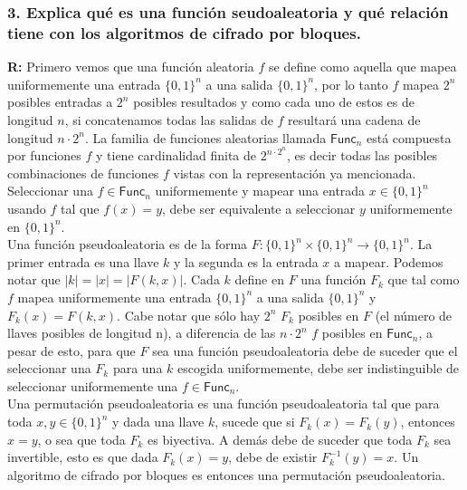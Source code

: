 \documentclass[12pt]{article}
\begin{document}
\subsubsection*{3. Explica qué es una función seudoaleatoria y qué relación tiene con los algoritmos de cifrado por bloques.}

\textbf{R:} Primero vemos que una función aleatoria $f$ se define como aquella que mapea uniformemente una entrada $\{0, 1\}^n$ a una salida $\{0, 1\}^n$, por lo tanto $f$ mapea $2^n$ posibles entradas a $2^n$ posibles resultados y como cada uno de estos es de longitud $n$, si concatenamos todas las salidas de $f$ resultará una cadena de longitud $n \cdot 2^n$. La familia de funciones aleatorias llamada $\textsf{Func}_n$ está compuesta por funciones $f$ y tiene cardinalidad finita de $2^{n\cdot2^n}$, es decir todas las posibles combinaciones de funciones $f$ vistas con la representación ya mencionada. Seleccionar una $f \in \textsf{Func}_n$ uniformemente  y mapear una entrada $x \in \{0, 1\}^n$ usando $f$ tal que $f(x) = y$, debe ser equivalente a seleccionar $y$ uniformemente en $\{0, 1\}^n$. \\

Una función pseudoaleatoria es de la forma $F : \{0, 1\}^n \times \{0, 1\}^n \rightarrow \{0, 1\}^n$. La primer entrada es una llave $k$ y la segunda es la entrada $x$ a mapear. Podemos notar que $|k| = |x| = |F(k,x)|$. Cada $k$ define en $F$ una función $F_k$ que tal como $f$ mapea uniformemente una entrada $\{0, 1\}^n$ a una salida $\{0, 1\}^n$ y $F_k(x) = F(k, x)$. Cabe notar que sólo hay $2^n$ $F_k$ posibles en $F$ (el número de llaves posibles de longitud n), a diferencia de las $n\cdot2^n$ $f$ posibles en $\textsf{Func}_n$, a pesar de esto, para que $F$ sea una función pseudoaleatoria debe de suceder que el seleccionar una $F_k$ para una $k$ escogida uniformemente, debe ser indistinguible de seleccionar uniformemente una $f \in \textsf{Func}_n$. \\

Una permutación pseudoaleatoria es una función pseudoaleatoria tal que para toda $x, y \in \{0, 1\}^n$ y dada una llave $k$, sucede que si $F_k(x) = F_k(y)$, entonces $x = y$, o sea que toda $F_k$ es biyectiva. A demás debe de suceder que toda $F_k$ sea invertible, esto es que dada $F_k(x) = y$, debe de existir $F_k^{-1}(y) = x$. Un algoritmo de cifrado por bloques es entonces una permutación pseudoaleatoria.
\end{document}
